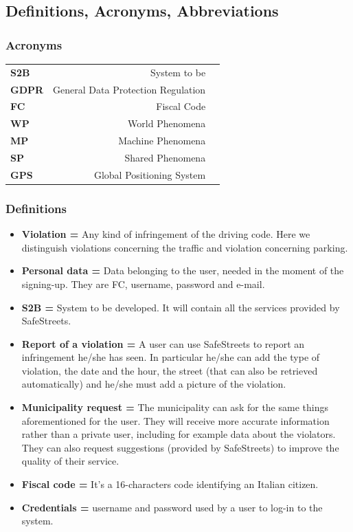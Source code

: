 \documentclass[titlepage]{article}
\begin{document}
\subsection{Definitions, Acronyms, Abbreviations}




\subsubsection{Acronyms}

\begin{tabular}{|l|rl|}
\hline

\textbf{S2B}	& System to be 	&				 			 \\
\textbf{GDPR}	& General Data Protection Regulation &	     \\
\textbf{FC}     & Fiscal Code    	&	 				 \\
\textbf{WP}     & World Phenomena       &	 				 \\
\textbf{MP}     & Machine Phenomena     &	 				 \\
\textbf{SP}     & Shared Phenomena      &     				 \\
\textbf{GPS}    & Global Positioning System &	 			 \\

\hline
\end{tabular}

\subsubsection{Definitions}
\begin{itemize}
	\item \textbf{Violation =} Any kind of infringement of the driving code. Here we distinguish violations concerning the traffic and violation concerning parking.\\
	\item \textbf{Personal data =} Data belonging to the user, needed in the moment of the signing-up. They are FC, username, password and e-mail.
	\item \textbf{S2B =} System to be developed. It will contain all the services provided by SafeStreets.
	\item \textbf{Report of a violation =} A user can use SafeStreets to report an infringement he/she has seen. In particular he/she can add the type of violation, the date and the hour, the street (that can also be retrieved automatically) and he/she must add a picture of the violation.
	\item \textbf{Municipality request =} The municipality can ask for the same things aforementioned for the user. They will receive more accurate information rather than a private user, including for example data about the violators. They can also request suggestions (provided by SafeStreets) to improve the quality of their service.
	\item \textbf{Fiscal code =} It's a 16-characters code identifying an Italian citizen.
	\item \textbf{Credentials =} username and password used by a user to log-in to the system.
	
\end{itemize}
\end{document}
